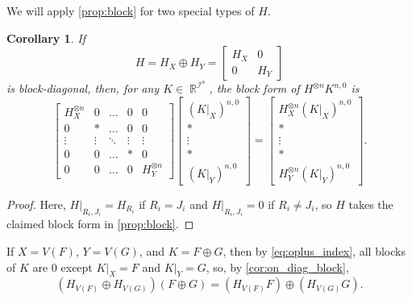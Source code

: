 \documentclass{article}
\newtheorem{corollary}{Corollary}[section]
\theoremstyle{remark}
\theoremstyle{definition}
\DeclareMathOperator{\rr}{\mathbb{R}}
\DeclareMathOperator{\ic}{\mathcal{I}}
\begin{document}
We will apply \autoref{prop:block} for two special types of $H$.
\begin{corollary}
    \label{cor:on_diag_block}
    If 
    \[
        H = H_X \oplus H_Y = \begin{bmatrix} H_X & 0 \\ 0 & H_Y\end{bmatrix}
    \]
    is block-diagonal, then, for any $K \in \rr^{\ic^n}$, 
    the block form of $H^{\otimes n} K^{n,0}$ is
    \[
        \begin{bmatrix} 
            H_X^{\otimes n} & 0 & \ldots & 0 & 0\\
            0 & * & \ldots & 0 & 0\\
            \vdots & \vdots & \ddots & \vdots & \vdots \\
            0 & 0 & \ldots & * & 0\\
            0 & 0 & \ldots & 0 & H_Y^{\otimes n}
        \end{bmatrix}
        \begin{bmatrix} 
            (K|_X)^{n,0} \\ * \\ \vdots \\ * \\ (K|_Y)^{n,0}
        \end{bmatrix} =
        \begin{bmatrix} 
            H_X^{\otimes n}(K|_X)^{n,0} \\ * \\ \vdots \\ * \\ H_Y^{\otimes n}(K|_Y)^{n,0}
        \end{bmatrix}.
    \]
\end{corollary}
\begin{proof}
    Here,
    $H|_{R_i,J_i} = H_{R_i}$ if $R_i = J_i$ and $H|_{R_i,J_i} = 0$ if $R_i\neq J_i$, so $H$ takes the
    claimed block form in \autoref{prop:block}.
\end{proof}
If $X = V(F)$, $Y = V(G)$, and $K = F \oplus G$, then by \eqref{eq:oplus_index},
all blocks of $K$ are 0 except $K|_X = F$ and $K|_Y = G$, so, by \autoref{cor:on_diag_block},
\begin{equation}
    \label{eq:oplus_action}
    (H_{V(F)} \oplus H_{V(G)})(F \oplus G) = (H_{V(F)} F) \oplus (H_{V(G)} G).
\end{equation}
\end{document}
